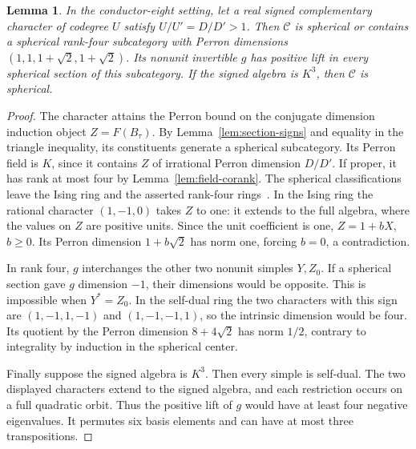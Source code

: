 \documentclass[11pt,reqno]{amsart}
\newtheorem{lemma}[theorem]{Lemma}
\theoremstyle{remark}\newtheorem{remark}[theorem]{Remark}
\numberwithin{equation}{section}
\begin{document}
\begin{lemma}\label{lem:silver-saturation}
In the conductor-eight setting, let a real signed complementary
character of codegree $U$ satisfy $U/U'=D/D'>1$. Then $\mathcal C$
is spherical or contains a spherical rank-four subcategory with
Perron dimensions $(1,1,1+\sqrt2,1+\sqrt2)$. Its nonunit
invertible $g$ has positive lift in every spherical section of
this subcategory. If the signed algebra is $K^3$, then
$\mathcal C$ is spherical.
\end{lemma}
\begin{proof}
The character attains the Perron bound on the conjugate dimension
induction object $Z=F(B_\tau)$. By Lemma~\ref{lem:section-signs}
and equality in the triangle inequality, its constituents generate
a spherical subcategory. Its Perron field is $K$, since it contains
$Z$ of irrational Perron dimension $D/D'$. If proper, it has rank
at most four by Lemma~\ref{lem:field-corank}. The spherical
classifications leave the Ising ring and the asserted rank-four
rings~\cite{Ostrik2,Ostrik3,DPP}. In the Ising ring the rational
character $(1,-1,0)$ takes $Z$ to one: it extends to the full algebra,
where the values on $Z$ are positive units. Since the unit coefficient
is one, $Z=1+bX$, $b\ge0$. Its Perron dimension $1+b\sqrt2$ has
norm one, forcing $b=0$, a contradiction.

In rank four, $g$ interchanges the other two nonunit simples $Y,Z_0$.
If a spherical section gave $g$ dimension $-1$, their dimensions
would be opposite. This is impossible when $Y^*=Z_0$. In the
self-dual ring the two characters with this sign are
$(1,-1,1,-1)$ and $(1,-1,-1,1)$, so the intrinsic dimension
would be four. Its quotient by the Perron dimension $8+4\sqrt2$
has norm $1/2$, contrary to integrality by induction in the
spherical center.

Finally suppose the signed algebra is $K^3$. Then every simple
is self-dual. The two displayed characters extend to the signed
algebra, and each restriction occurs on a full quadratic orbit.
Thus the positive lift of $g$ would have at least four negative
eigenvalues. It permutes six basis elements and can have at most
three transpositions.
\end{proof}
\end{document}
